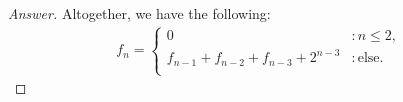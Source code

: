 \documentclass[11pt]{article}
\theoremstyle{definition}
\theoremstyle{definition}
\theoremstyle{definition}
\begin{document}
\begin{proof}[Answer]
Altogether, we have the following:\\

\begin{align*}
	f_n = \begin{cases}
		0 & : n \leq 2, \\
		f_{n-1} + f_{n-2} + f_{n - 3} + 2^{n - 3} &: \text{else}.\\
	\end{cases}
\end{align*}
\end{proof}
\end{document}
